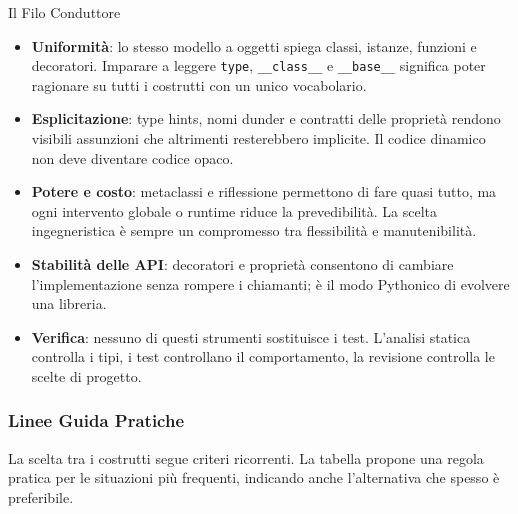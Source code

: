 \documentclass[12pt]{extarticle}
\begin{document}
\begin{cbox}{Il Filo Conduttore}
\begin{itemize}
    \item \textbf{Uniformità}: lo stesso modello a oggetti spiega classi, istanze, funzioni e decoratori. Imparare a leggere \texttt{type}, \texttt{\_\_class\_\_} e \texttt{\_\_base\_\_} significa poter ragionare su tutti i costrutti con un unico vocabolario.
    \item \textbf{Esplicitazione}: type hints, nomi dunder e contratti delle proprietà rendono visibili assunzioni che altrimenti resterebbero implicite. Il codice dinamico non deve diventare codice opaco.
    \item \textbf{Potere e costo}: metaclassi e riflessione permettono di fare quasi tutto, ma ogni intervento globale o runtime riduce la prevedibilità. La scelta ingegneristica è sempre un compromesso tra flessibilità e manutenibilità.
    \item \textbf{Stabilità delle API}: decoratori e proprietà consentono di cambiare l'implementazione senza rompere i chiamanti; è il modo Pythonico di evolvere una libreria.
    \item \textbf{Verifica}: nessuno di questi strumenti sostituisce i test. L'analisi statica controlla i tipi, i test controllano il comportamento, la revisione controlla le scelte di progetto.
\end{itemize}
\end{cbox}

\subsubsection{Linee Guida Pratiche}

\noindent La scelta tra i costrutti segue criteri ricorrenti. La tabella propone una regola pratica per le situazioni più frequenti, indicando anche l'alternativa che spesso è preferibile.
\end{document}
